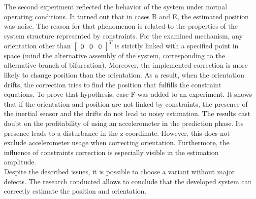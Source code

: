 The second experiment reflected the behavior of the system under normal operating conditions. It turned out that in cases B and E, the estimated position was noise. The reason for that phenomenon is related to the properties of the system structure represented by constraints. For the examined mechanism, any orientation other than $\begin{bmatrix}0 & 0 & 0 \end{bmatrix}^T$ is strictly linked with a specified point in space (mind the alternative assembly of the system, corresponding to the alternative branch of bifurcation). Moreover, the implemented correction is more likely to change position than the orientation. As a result, when the orientation drifts, the correction tries to find the position that fulfills the constraint equations. To prove that hypothesis, case F was added to an experiment. It shows that if the orientation and position are not linked by constraints, the presence of the inertial sensor and the drifts do not lead to noisy estimation. The results cast doubt on the profitability of using an accelerometer in the prediction phase. Its presence leads to a disturbance in the z coordinate. However, this does not exclude accelerometer usage when correcting orientation. Furthermore, the influence of constraints correction is especially visible in the estimation amplitude.\\
  
Despite the described issues, it is possible to choose a variant without major defects.
The research conducted allows to conclude that the developed system can correctly estimate the position and orientation. 



